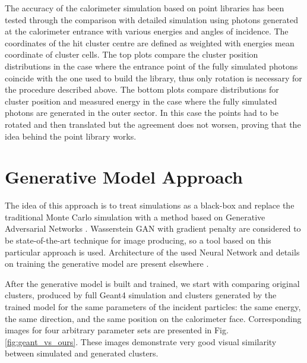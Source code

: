 \documentclass{PoS}
\begin{document}
The accuracy of the calorimeter simulation based on point libraries
has been tested through the comparison with detailed simulation using
photons generated at the calorimeter entrance with various energies
and angles of incidence. The coordinates of the hit cluster centre are
defined as weighted with energies mean coordinate of cluster cells. 
The top plots compare the cluster position distributions in the case
where the entrance point of the fully simulated photons coincide with
the one used to build the library, thus only rotation is necessary for
the procedure described above.
The bottom plots compare  distributions for cluster position and
measured energy in the case where the fully simulated photons are
generated in the outer sector. 
In this case the points had to be rotated and then translated but the agreement does not worsen, proving that the idea behind the point library works.

\section {Generative Model Approach}
The idea of this approach  is to treat simulations as a black-box and
replace the traditional Monte Carlo simulation with a method based on
Generative Adversarial Networks \cite{gan}. Wasserstein GAN \cite{wgan}
with gradient penalty are considered to be state-of-the-art technique
for image producing, so a tool based on this particular approach is
used. Architecture of the used Neural Network and details on training
the generative model are present elsewhere \cite{chepGAN}.

After the generative model is built and trained,
we start with comparing original clusters, produced by full Geant4
simulation and clusters generated by the trained model for the same
parameters of the incident particles: the same energy, the same
direction, and the same position on the calorimeter
face. Corresponding images for four arbitrary parameter sets are
presented in Fig. \ref{fig:geant_vs_ours}. These images demonstrate very good visual similarity between simulated and generated clusters.
\end{document}
